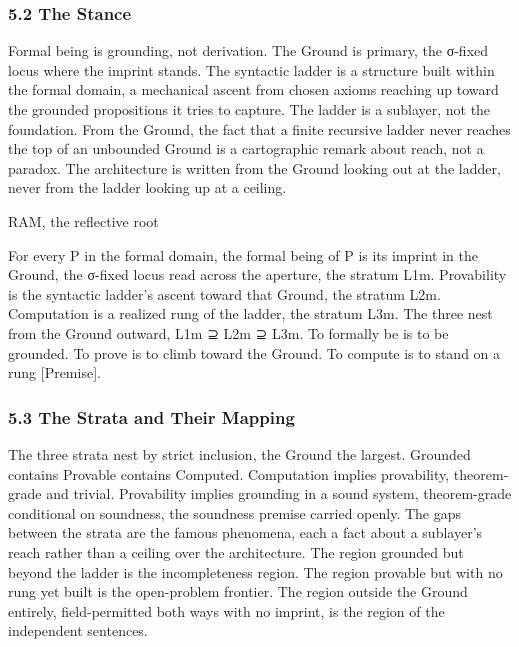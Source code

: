 \documentclass[10pt,twocolumn]{article}
\begin{document}
\hypertarget{the-stance}{%
\subsubsection{5.2 The Stance}\label{the-stance}}

Formal being is grounding, not derivation. The Ground is primary, the
σ-fixed locus where the imprint stands. The syntactic ladder is a
structure built within the formal domain, a mechanical ascent from
chosen axioms reaching up toward the grounded propositions it tries to
capture. The ladder is a sublayer, not the foundation. From the Ground,
the fact that a finite recursive ladder never reaches the top of an
unbounded Ground is a cartographic remark about reach, not a paradox.
The architecture is written from the Ground looking out at the ladder,
never from the ladder looking up at a ceiling.

\begin{jbox}{RAM, the reflective root}

For every P in the formal domain, the formal being of P is its imprint
in the Ground, the σ-fixed locus read across the aperture, the stratum
L1m. Provability is the syntactic ladder's ascent toward that Ground,
the stratum L2m. Computation is a realized rung of the ladder, the
stratum L3m. The three nest from the Ground outward, L1m ⊇ L2m ⊇ L3m. To
formally be is to be grounded. To prove is to climb toward the Ground.
To compute is to stand on a rung {[}Premise{]}.

\end{jbox}

\hypertarget{the-strata-and-their-mapping}{%
\subsubsection{5.3 The Strata and Their
Mapping}\label{the-strata-and-their-mapping}}

The three strata nest by strict inclusion, the Ground the largest.
Grounded contains Provable contains Computed. Computation implies
provability, theorem-grade and trivial. Provability implies grounding in
a sound system, theorem-grade conditional on soundness, the soundness
premise carried openly. The gaps between the strata are the famous
phenomena, each a fact about a sublayer's reach rather than a ceiling
over the architecture. The region grounded but beyond the ladder is the
incompleteness region. The region provable but with no rung yet built is
the open-problem frontier. The region outside the Ground entirely,
field-permitted both ways with no imprint, is the region of the
independent sentences.
\end{document}
